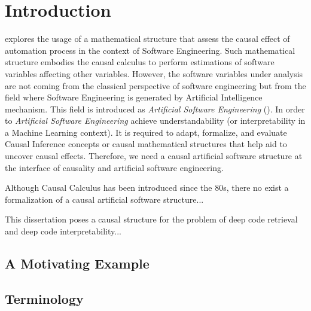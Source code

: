 \chapter{Introduction} %
\label{ch:intro}

 explores the usage of a mathematical structure that assess the causal effect of automation process in the context of Software Engineering. Such mathematical structure embodies the causal calculus to perform estimations of software variables affecting other variables. However, the software variables under analysis are not coming from the classical perspective of software engineering but from the field where Software Engineering is generated by Artificial Intelligence mechanism. This field is introduced as \textit{Artificial Software Engineering} (\asofte). In order to \textit{Artificial Software Engineering} achieve understandability (or interpretability in a Machine Learning context). It is required to adapt, formalize, and evaluate Causal Inference concepts or causal mathematical structures that help aid to uncover causal effects. Therefore, we need a causal artificial software structure at the interface of causality and artificial software engineering.  

Although Causal Calculus has been introduced since the 80s, there no exist a formalization of a causal artificial software structure...  

This dissertation poses a causal structure for the problem of deep code retrieval and deep code interpretability...







\section{A Motivating Example}

\section{Terminology}

